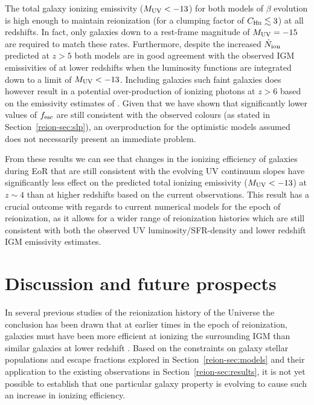 The total galaxy ionizing emissivity ($M_{\rm{UV}} < -13$) for both models of $\beta$ evolution is high enough to maintain reionization (for a clumping factor of $C_{\textsc{Hii}} \lesssim 3$) at all redshifts. In fact, only galaxies down to a rest-frame magnitude of $M_{\rm{UV}} = -15$ are required to match these rates. Furthermore, despite the increased $\dot{N}_{\rm{ion}}$ predicted at $z > 5$ both models are in good agreement with the observed IGM emissivities of \citet{Becker:2013hc} at lower redshifts when the luminosity functions are integrated down to a limit of $M_{\rm{UV}} < -13$. Including galaxies such faint galaxies does however result in a potential over-production of ionizing photons at $z> 6$ based on the emissivity estimates of \citet{Bouwens:2015tm}. Given that we have shown that significantly lower values of $f_{\rm{esc}}$ are still consistent with the observed colours (as stated in Section~\ref{reion-sec:slp}), an overproduction for the optimistic models assumed does not necessarily present an immediate problem.

From these results we can see that changes in the ionizing efficiency of galaxies during EoR that are still consistent with the evolving UV continuum slopes have significantly less effect on the predicted total ionizing emissivity ($M_{\rm{UV}} < -13$) at $z\sim4$ than at higher redshifts based on the current observations. This result has a crucial outcome with regards to current numerical models for the epoch of reionization, as it allows for a wider range of reionization histories which are still consistent with both the observed UV luminosity/SFR-density and lower redshift IGM emissivity estimates. 

\section{Discussion and future prospects}\label{reion-sec:discussion}
In several previous studies of the reionization history of the Universe the conclusion has been drawn that at earlier times in the epoch of reionization, galaxies must have been more efficient at ionizing the surrounding IGM than similar galaxies at lower redshift \citep{Becker:2013hc,Kuhlen:2012ka,Robertson:2013ji}. Based on the constraints on galaxy stellar populations and escape fractions explored in Section~\ref{reion-sec:models} and their application to the existing observations in Section~\ref{reion-sec:results}, it is not yet possible to establish that one particular galaxy property is evolving to cause such an increase in ionizing efficiency. 

